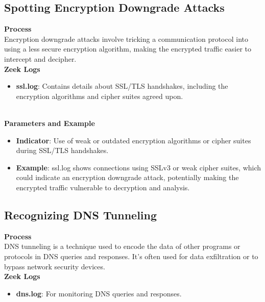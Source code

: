 \vspace{8pt}
\subsection{Spotting Encryption Downgrade Attacks}
\textbf{Process}
\vspace{8pt}
\\
Encryption downgrade attacks involve tricking a communication protocol into using a less secure encryption algorithm, making the encrypted traffic easier to intercept and decipher.
\vspace{10pt}
\\

\noindent \textbf{Zeek Logs}
\begin{itemize}
    \item \textbf{ssl.log}: Contains details about SSL/TLS handshakes, including the encryption algorithms and cipher suites agreed upon.
\end{itemize}
\vspace{10pt}
\\

\noindent \textbf{Parameters and Example}
\begin{itemize}
    \item \textbf{Indicator}: Use of weak or outdated encryption algorithms or cipher suites during SSL/TLS handshakes.
    \item \textbf{Example}: ssl.log shows connections using SSLv3 or weak cipher suites, which could indicate an encryption downgrade attack, potentially making the encrypted traffic vulnerable to decryption and analysis.
\end{itemize}

\vspace{8pt}
\subsection{Recognizing DNS Tunneling}
\textbf{Process}
\vspace{8pt}
\\
DNS tunneling is a technique used to encode the data of other programs or protocols in DNS queries and responses. It's often used for data exfiltration or to bypass network security devices.
\vspace{10pt}
\\

\noindent \textbf{Zeek Logs}
\begin{itemize}
    \item \textbf{dns.log}: For monitoring DNS queries and responses.
\end{itemize}
\vspace{10pt}
\\

